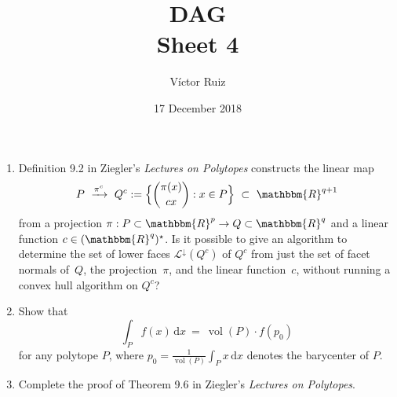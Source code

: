 \documentclass[11pt]{article}
\title{DAG \\Sheet 4}
\author{Víctor Ruiz}
\date{17 December 2018}
\DeclareMathOperator{\vol}{vol}
\newcommand{\RR}{\mathbbm{R}}
\begin{document}
\maketitle

\begin{enumerate}
\item Definition 9.2 in Ziegler's \emph{Lectures on Polytopes} constructs the linear map
  \[
    P
    \ \xrightarrow{\pi^c}\ 
    Q^c :=
    \Big\{ \binom{\pi(x)}{cx} : x\in P\Big\}
    \ \subset \
    \RR^{q+1}
  \]
  from a projection $\pi:P\subset\RR^p\to Q\subset\RR^q$ and a linear function $c\in(\RR^q)^\star$.
  Is it possible to give an algorithm to determine the set of lower faces $\mathcal L^\downarrow(Q^c)$ of $Q^c$ from just the set of facet normals of~$Q$, the projection~$\pi$, and the linear function~$c$, without running a convex hull algorithm on $Q^c$?

  \bigskip\bigskip
\item Show that
  \[
    \int_P f(x)\,\text{d}x
    \ = \
    \vol(P) \cdot f(p_0)
  \]
  for any polytope $P$, where $p_0 = \frac{1}{\vol(P)}\int_P x\,\text{d}x$ denotes the barycenter of $P$.
  \bigskip\bigskip
\item Complete the proof of Theorem 9.6 in Ziegler's \emph{Lectures on Polytopes}.
  
\end{enumerate}
\end{document}
